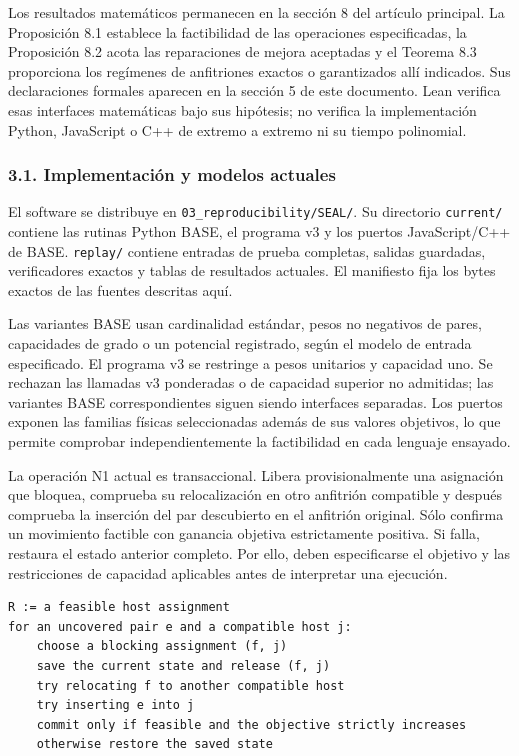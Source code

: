 \documentclass[spanish,11pt,a4paper]{article}
\begin{document}
Los resultados matemáticos permanecen en la sección 8 del artículo
principal. La Proposición 8.1 establece la factibilidad de las
operaciones especificadas, la Proposición 8.2 acota las reparaciones de
mejora aceptadas y el Teorema 8.3 proporciona los regímenes de
anfitriones exactos o garantizados allí indicados. Sus declaraciones
formales aparecen en la sección 5 de este documento. Lean verifica esas
interfaces matemáticas bajo sus hipótesis; no verifica la implementación
Python, JavaScript o C++ de extremo a extremo ni su tiempo polinomial.

\subsubsection{3.1. Implementación y modelos
actuales}\label{implementaciuxf3n-y-modelos-actuales}

El software se distribuye en \nolinkurl{03_reproducibility/SEAL/}. Su
directorio \texttt{current/} contiene las rutinas Python BASE, el
programa v3 y los puertos JavaScript/C++ de BASE. \texttt{replay/}
contiene entradas de prueba completas, salidas guardadas, verificadores
exactos y tablas de resultados actuales. El manifiesto fija los bytes
exactos de las fuentes descritas aquí.

Las variantes BASE usan cardinalidad estándar, pesos no negativos de
pares, capacidades de grado o un potencial registrado, según el modelo
de entrada especificado. El programa v3 se restringe a pesos unitarios y
capacidad uno. Se rechazan las llamadas v3 ponderadas o de capacidad
superior no admitidas; las variantes BASE correspondientes siguen siendo
interfaces separadas. Los puertos exponen las familias físicas
seleccionadas además de sus valores objetivos, lo que permite comprobar
independientemente la factibilidad en cada lenguaje ensayado.

La operación N1 actual es transaccional. Libera provisionalmente una
asignación que bloquea, comprueba su relocalización en otro anfitrión
compatible y después comprueba la inserción del par descubierto en el
anfitrión original. Sólo confirma un movimiento factible con ganancia
objetiva estrictamente positiva. Si falla, restaura el estado anterior
completo. Por ello, deben especificarse el objetivo y las restricciones
de capacidad aplicables antes de interpretar una ejecución.

\begin{verbatim}
R := a feasible host assignment
for an uncovered pair e and a compatible host j:
    choose a blocking assignment (f, j)
    save the current state and release (f, j)
    try relocating f to another compatible host
    try inserting e into j
    commit only if feasible and the objective strictly increases
    otherwise restore the saved state
\end{verbatim}
\end{document}
